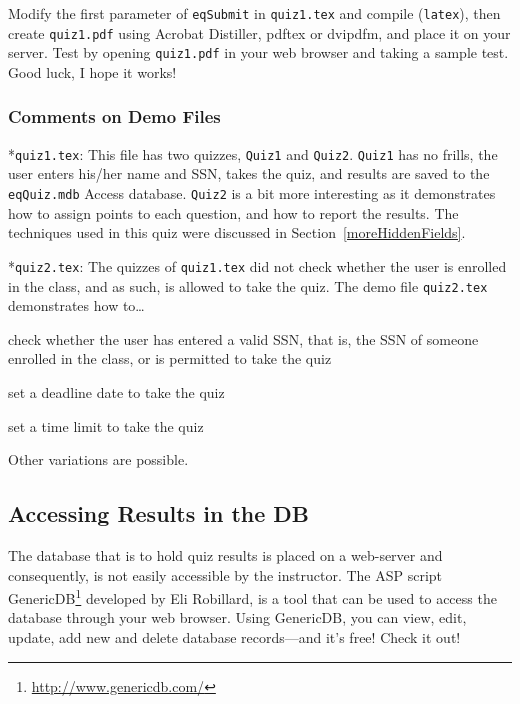 \documentclass{article}
\makeatletter
\let\bslash=\@backslashchar
\renewcommand{\paragraph}
    {\@startsection{paragraph}{4}{0pt}{6pt}{-3pt}
    {\normalfont\normalsize\bfseries}}
\def\cs#1{\texttt{\bslash#1}}
\makeatother
\begin{document}
Modify the first parameter of \cs{eqSubmit} in \texttt{quiz1.tex}
and compile (\texttt{latex}), then create \texttt{quiz1.pdf} using
\textsf{Acrobat Distiller}, \textsf{pdftex} or \textsf{dvipdfm},
and place it on your server. Test  by opening \texttt{quiz1.pdf}
in your web browser and taking a sample test.  Good luck, I hope it works!

\subsubsection{Comments on Demo Files}\label{demofiles}

\paragraph*{\texttt{quiz1.tex}:}  This file has two quizzes,
\texttt{Quiz1} and \texttt{Quiz2}. \texttt{Quiz1} has no frills,
the user enters his/her name and SSN, takes the quiz, and results
are saved to the \texttt{eqQuiz.mdb} Access database.
\texttt{Quiz2} is a bit more interesting as it demonstrates how to
assign points to each question, and how to report the results. The
techniques used in this quiz were discussed in
Section~\ref{moreHiddenFields}.

\paragraph*{\texttt{quiz2.tex}:} The quizzes of \texttt{quiz1.tex}
did not check whether the user is enrolled in the class, and as
such, is allowed to take the quiz. The demo file
\texttt{quiz2.tex} demonstrates how to\dots
\begin{questions}
    \item check whether the user has entered a valid SSN, that is, the
        SSN of someone enrolled in the class, or is permitted to take the quiz

    \item set a deadline date to take the quiz

    \item set a time limit to take the quiz
\end{questions}
Other variations are possible.


\subsection{Accessing Results in the DB}

The database that is to hold quiz results is placed on a
web-server and consequently, is not easily accessible by the
instructor. The ASP  script \textsf{GenericDB}\footnote{\url{http://www.genericdb.com/}} developed by Eli Robillard, is
a tool that can be used to access the database through your web
browser. Using \textsf{GenericDB}, you can view, edit, update, add
new and delete database records---and it's free! Check it out!
\end{document}
